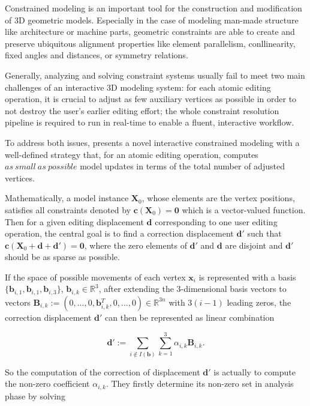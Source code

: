 Constrained modeling is an important tool for the construction and modification of 3D geometric models.
Especially in the case of modeling man-made structure like architecture or machine parts, geometric constraints are able to create and preserve ubiquitous alignment properties like element parallelism, conllinearity, fixed angles and distances, or symmetry relations.

Generally, analyzing and solving constraint systems usually fail to meet two main challenges of an interactive 3D modeling system: for each atomic editing operation,
it is crucial to adjust as few auxiliary vertices as possible in order to not destroy the user's earlier editing effort;
the whole constraint resolution pipeline is required to run in real-time to enable a fluent, interactive workflow.

To address both issues, \cite{habbecke2012linear} presents a novel interactive constrained modeling with a well-defined strategy that, for an atomic editing operation, computes $as~small~as~possible$ model updates in terms of the total number of adjusted vertices.

Mathematically, a model instance $\mathbf{X}_0$, whose elements are the vertex positions, satisfies all constraints denoted by $\mathbf{c}(\mathbf{X}_0)=\mathbf{0}$ which is a vector-valued function. Then for a given editing displacement $\mathbf{d}$ corresponding to one user editing operation, the central goal is to find a correction displacement $\mathbf{d'}$  such that $\mathbf{c}(\mathbf{X}_0+\mathbf{d}+\mathbf{d'})=\mathbf{0}$, where the zero elements of $\mathbf{d'}$ and $\mathbf{d}$ are disjoint and $\mathbf{d'}$ should be as sparse as possible.

If the space of possible movements of each vertex $\mathbf{x}_{i}$ is represented with a basis $\{\mathbf{b}_{i,1},\mathbf{b}_{i,1},\mathbf{b}_{i,3}\}$, $\mathbf{b}_{i,k} \in \mathbb{R}^3$, after extending the 3-dimensional basis vectors to vectors $\mathbf{B}_{i,k}:=(0,...,0,\mathbf{b}{_{i,k}^{T}},0,...,0) \in \mathbb{R}^{3n}$ with $3(i-1)$ leading zeros, the correction displacement $\mathbf{d'}$ can then be represented as linear combination

\small{
\begin{equation}
 \label{eq:ConstrainedModeling1}
 \mathbf{d'} := \sum_{i\notin I(\mathbf{b})}^{}\sum_{k=1}^{3}\alpha_{i,k}\mathbf{B}_{i,k}.
\end{equation}
}

So the computation of the correction of displacement $\mathbf{d'}$ is actually to compute the non-zero coefficient $\alpha_{i,k}$.
They firstly determine its non-zero set in analysis phase by solving

